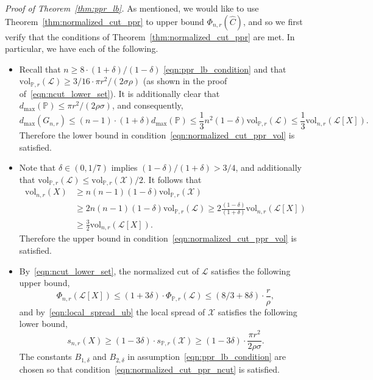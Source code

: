 \documentclass[twoside,11pt]{article}
\newcommand{\1}{\mathbf{1}}
\newcommand{\mc}[1]{\mathcal{#1}}
\newcommand{\Pbb}{\mathbb{P}}
\newcommand{\wh}[1]{\widehat{#1}}
\newcommand{\vol}{\mathrm{vol}}
\begin{document}
\noindent \emph{Proof of Theorem~\ref{thm:ppr_lb}.}
As mentioned, we would like to use Theorem~\ref{thm:normalized_cut_ppr} to upper bound $\Phi_{n,r}(\wh{C})$, and so we first verify that the conditions of Theorem~\ref{thm:normalized_cut_ppr} are met. In particular, we have each of the following.
\begin{itemize}
	\item Recall that $n \geq 8 \cdot (1 + \delta)/(1 - \delta)$ \eqref{eqn:ppr_lb_condition} and that $\vol_{\Pbb,r}(\mc{L}) \geq 3/16 \cdot \pi r^2/(2\sigma\rho)$ (as shown in the proof of~\eqref{eqn:ncut_lower_set}). It is additionally clear that $d_{\max}(\Pbb) \leq \pi r^2 /(2\rho\sigma)$, and consequently,
	\begin{equation}
	\label{pf:ppr_lb_1}
	d_{\max}(G_{n,r}) \leq (n - 1) \cdot (1 + \delta) d_{\max}(\Pbb) \leq \frac{1}{3}n^2 (1 - \delta) \vol_{\Pbb,r}(\mc{L}) \leq \frac{1}{3}\vol_{n,r}(\mc{L}[X]).
	\end{equation}
	Therefore the lower bound in condition~\eqref{eqn:normalized_cut_ppr_vol} is satisfied.
	\item Note that $\delta \in (0,1/7)$ implies $(1 - \delta)/(1 + \delta) > 3/4$, and additionally that $\vol_{\Pbb,r}(\mc{L}) \leq \vol_{\Pbb,r}(\mc{X})/2$. It follows that
	\begin{equation}
	\begin{aligned}
	\label{pf:ppr_lb_2}
	\vol_{n,r}(X) & \geq n(n - 1)(1 - \delta) \vol_{\Pbb,r}(\mc{X}) \\
	& \geq 2n(n - 1) (1 - \delta) \vol_{\Pbb,r}(\mc{L}) \geq 2\frac{(1 - \delta)}{(1 + \delta)} \vol_{n,r}(\mc{L}[X]) \\
	& \geq \frac{3}{2} \vol_{n,r}(\mc{L}[X]).
	\end{aligned}
	\end{equation}
	Therefore the upper bound in condition~\eqref{eqn:normalized_cut_ppr_vol} is satisfied.
	\item By~\eqref{eqn:ncut_lower_set}, the normalized cut of $\mc{L}$ satisfies the following upper bound,
	\begin{equation}
	\Phi_{n,r}(\mc{L}[X]) \leq (1 + 3\delta) \cdot \Phi_{\Pbb,r}(\mc{L}) \leq (8/3 + 8\delta) \cdot  \frac{r}{\rho}, 
	\end{equation}
	and by~\eqref{eqn:local_spread_ub} the local spread of $\mc{X}$ satisfies the following lower bound,
	\begin{equation}
	s_{n,r}(X) \geq (1 - 3\delta) \cdot s_{\Pbb,r}(\mc{X}) \geq (1 - 3\delta) \cdot \frac{\pi r^2}{2\rho\sigma}.
	\end{equation}
	The constants $B_{1,\delta}$ and $B_{2,\delta}$ in assumption~\eqref{eqn:ppr_lb_condition} are chosen so that condition~\eqref{eqn:normalized_cut_ppr_ncut} is satisfied.
\end{itemize}
\end{document}
